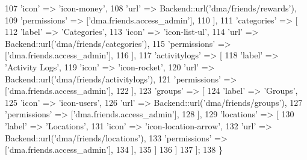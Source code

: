\begin{DoxyCode}
107                         \textcolor{stringliteral}{'icon'}          => \textcolor{stringliteral}{'icon-money'},
108                         \textcolor{stringliteral}{'url'}           => Backend::url(\textcolor{stringliteral}{'dma/friends/rewards'}),
109                         \textcolor{stringliteral}{'permissions'}   => [\textcolor{stringliteral}{'dma.friends.access\_admin'}],
110                     ],
111                     \textcolor{stringliteral}{'categories'} => [
112                         \textcolor{stringliteral}{'label'}         => \textcolor{stringliteral}{'Categories'},
113                         \textcolor{stringliteral}{'icon'}          => \textcolor{stringliteral}{'icon-list-ul'},
114                         \textcolor{stringliteral}{'url'}           => Backend::url(\textcolor{stringliteral}{'dma/friends/categories'}),
115                         \textcolor{stringliteral}{'permissions'}   => [\textcolor{stringliteral}{'dma.friends.access\_admin'}],
116                     ],  
117                     \textcolor{stringliteral}{'activitylogs'}   => [
118                         \textcolor{stringliteral}{'label'}         => \textcolor{stringliteral}{'Activity Logs'},
119                         \textcolor{stringliteral}{'icon'}          => \textcolor{stringliteral}{'icon-rocket'},
120                         \textcolor{stringliteral}{'url'}           => Backend::url(\textcolor{stringliteral}{'dma/friends/activitylogs'}),
121                         \textcolor{stringliteral}{'permissions'}   => [\textcolor{stringliteral}{'dma.friends.access\_admin'}],
122                     ],
123                     \textcolor{stringliteral}{'groups'}   => [
124                         \textcolor{stringliteral}{'label'}         => \textcolor{stringliteral}{'Groups'},
125                         \textcolor{stringliteral}{'icon'}          => \textcolor{stringliteral}{'icon-users'},
126                         \textcolor{stringliteral}{'url'}           => Backend::url(\textcolor{stringliteral}{'dma/friends/groups'}),
127                         \textcolor{stringliteral}{'permissions'}   => [\textcolor{stringliteral}{'dma.friends.access\_admin'}],
128                     ],
129                     \textcolor{stringliteral}{'locations'} => [
130                         \textcolor{stringliteral}{'label'}         => \textcolor{stringliteral}{'Locations'},
131                         \textcolor{stringliteral}{'icon'}          => \textcolor{stringliteral}{'icon-location-arrow'},
132                         \textcolor{stringliteral}{'url'}           => Backend::url(\textcolor{stringliteral}{'dma/friends/locations'}),
133                         \textcolor{stringliteral}{'permissions'}   => [\textcolor{stringliteral}{'dma.friends.access\_admin'}],
134                     ],                
135                 ]
136             ]
137         ];
138     \}
\end{DoxyCode}
\hypertarget{classDMA_1_1Friends_1_1Plugin_a1f5f007ec6f0f3f16516cf1a2e19d296}{}
